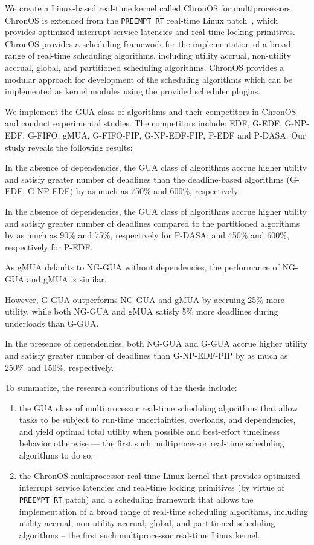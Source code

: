 \documentclass[12pt,dvips]{report}
\begin{document}
We create a Linux-based real-time kernel called ChronOS for multiprocessors. ChronOS is extended from the \texttt{PREEMPT\_RT} real-time Linux patch~\cite{preempt_rt}, which provides optimized interrupt service latencies and real-time locking primitives. ChronOS provides a scheduling framework for the implementation of a broad range of real-time scheduling algorithms, including utility accrual, non-utility accrual, global, and partitioned scheduling algorithms. ChronOS provides a modular approach for development of the scheduling algorithms which can be implemented as kernel modules using the provided scheduler plugins.

We implement the GUA class of algorithms and their competitors in ChronOS and conduct experimental studies. The competitors include: EDF, G-EDF, G-NP-EDF, G-FIFO, gMUA, G-FIFO-PIP, G-NP-EDF-PIP, P-EDF and P-DASA. Our study reveals the following results:
\begin{asparaenum}[(1)]
	\item In the absence of dependencies, the GUA class of algorithms accrue higher 
	utility and satisfy greater number of deadlines than the deadline-based algorithms 
	(G-EDF, G-NP-EDF) by as much as 750\% and 600\%, respectively.
	\item In the absence of dependencies, the GUA class of algorithms accrue higher
	utility and satisfy greater number of deadlines compared to the partitioned algorithms
	by as much as 90\% and 75\%, respectively for P-DASA; and 450\% and 600\%,
	respectively for P-EDF.
	\item As gMUA defaults to NG-GUA without dependencies, the performance of NG-GUA
	and gMUA is similar.
	\item However, G-GUA outperforms NG-GUA and gMUA by accruing 25\% more utility, 
	while both NG-GUA and gMUA satisfy 5\% more deadlines during underloads than G-GUA.
	
	\item In the presence of dependencies, both NG-GUA and G-GUA accrue higher utility and
	satisfy greater number of deadlines than G-NP-EDF-PIP by as much as 250\% and 150\%, respectively.
\end{asparaenum}

To summarize, the research contributions of the thesis include:
\begin{enumerate}
	\item the GUA class of multiprocessor real-time scheduling algorithms that allow tasks to be subject to run-time uncertainties, overloads, and dependencies, and yield optimal total utility when possible and best-effort timeliness behavior otherwise --- the first such multiprocessor real-time scheduling algorithms to do so.
	\item the ChronOS multiprocessor real-time Linux kernel that provides optimized interrupt service latencies and real-time locking primitives (by virtue of \texttt{PREEMPT\_RT} patch) and a scheduling framework that allows the implementation of a broad range of real-time scheduling algorithms, including utility accrual, non-utility accrual, global, and partitioned scheduling algorithms -- the first such multiprocessor real-time Linux kernel.
\end{enumerate}
\end{document}
